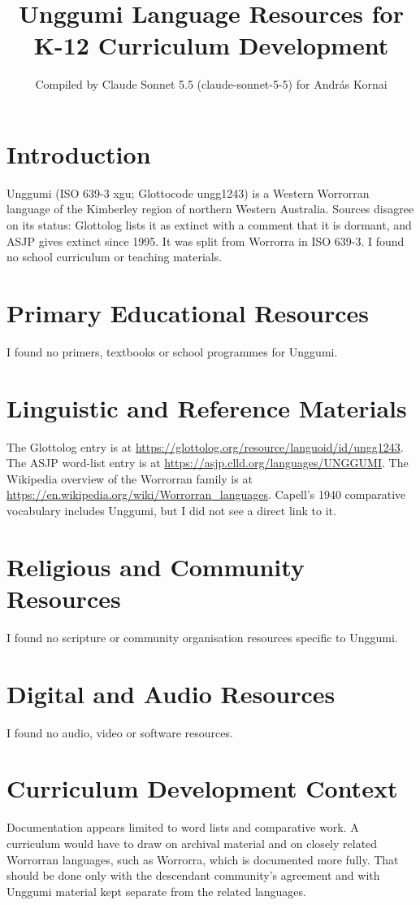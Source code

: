 \documentclass[12pt]{article}
\title{Unggumi Language Resources for K-12 Curriculum Development}
\author{Compiled by Claude Sonnet 5.5 (claude-sonnet-5-5) for Andr\'as Kornai}
\date{}
\begin{document}
\maketitle

\section{Introduction}
Unggumi (ISO 639-3 xgu; Glottocode ungg1243) is a Western Worrorran language of the Kimberley region of northern Western Australia. Sources disagree on its status: Glottolog lists it as extinct with a comment that it is dormant, and ASJP gives extinct since 1995. It was split from Worrorra in ISO 639-3. I found no school curriculum or teaching materials.

\section{Primary Educational Resources}
I found no primers, textbooks or school programmes for Unggumi.

\section{Linguistic and Reference Materials}
The Glottolog entry is at \url{https://glottolog.org/resource/languoid/id/ungg1243}. The ASJP word-list entry is at \url{https://asjp.clld.org/languages/UNGGUMI}. The Wikipedia overview of the Worrorran family is at \url{https://en.wikipedia.org/wiki/Worrorran_languages}. Capell's 1940 comparative vocabulary includes Unggumi, but I did not see a direct link to it.

\section{Religious and Community Resources}
I found no scripture or community organisation resources specific to Unggumi.

\section{Digital and Audio Resources}
I found no audio, video or software resources.

\section{Curriculum Development Context}
Documentation appears limited to word lists and comparative work. A curriculum would have to draw on archival material and on closely related Worrorran languages, such as Worrorra, which is documented more fully. That should be done only with the descendant community's agreement and with Unggumi material kept separate from the related languages.
\end{document}
